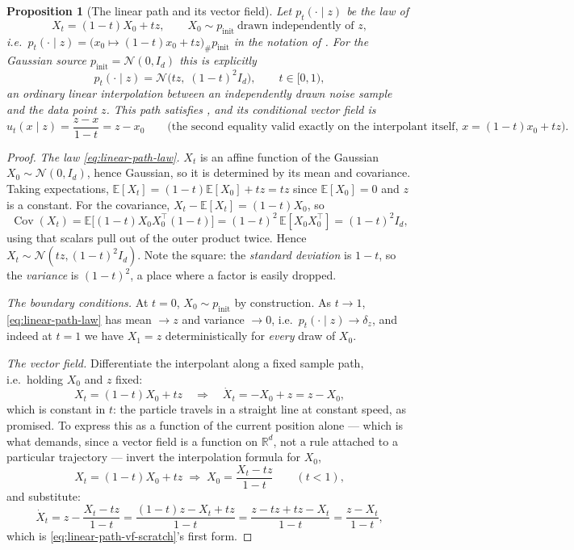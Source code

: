 \documentclass[11pt,a4paper]{report}
\newtheorem{proposition}[proposition]{Proposition}
\theoremstyle{definition}
\theoremstyle{remark}
\DeclareMathOperator{\Cov}{Cov}
\newcommand{\RR}{\mathbb R}
\newcommand{\EE}{\mathbb E}
\begin{document}
\begin{proposition}[The linear path and its vector field]
\label{prop:linear-path-scratch}
Let $p_t(\cdot\mid z)$ be the law of
\[
X_t = (1-t)X_0 + tz , \qquad X_0\sim p_{\mathrm{init}}\ \text{drawn independently of } z ,
\]
i.e.\ $p_t(\cdot\mid z) = \bigl(x_0\mapsto (1-t)x_0+tz\bigr)_{\#}p_{\mathrm{init}}$
in the notation of . For the Gaussian source
$p_{\mathrm{init}}=\mathcal N(0,I_d)$ this is explicitly
\begin{equation}
\label{eq:linear-path-law}
p_t(\cdot\mid z) = \mathcal N\bigl(tz,\;(1-t)^2 I_d\bigr) ,
\qquad t\in[0,1) ,
\end{equation}
an ordinary linear interpolation between an independently drawn noise sample
and the data point $z$. This path satisfies , and its
conditional vector field is
\begin{equation}
\label{eq:linear-path-vf-scratch}
u_t(x\mid z) = \frac{z-x}{1-t} = z - x_0
\qquad\text{(the second equality valid exactly on the interpolant itself, }x=(1-t)x_0+tz\text{).}
\end{equation}
\end{proposition}

\begin{proof}
\emph{The law \eqref{eq:linear-path-law}.} $X_t$ is an affine function of
the Gaussian $X_0\sim\mathcal N(0,I_d)$, hence Gaussian, so it is
determined by its mean and covariance. Taking expectations,
$\EE[X_t] = (1-t)\EE[X_0] + tz = tz$ since $\EE[X_0]=0$ and $z$ is a
constant. For the covariance, $X_t-\EE[X_t] = (1-t)X_0$, so
\[
\Cov(X_t) = \EE\bigl[(1-t)X_0X_0^\top(1-t)\bigr] = (1-t)^2\,\EE[X_0X_0^\top] = (1-t)^2I_d ,
\]
using that scalars pull out of the outer product twice. Hence
$X_t\sim\mathcal N(tz,(1-t)^2I_d)$. Note the square: the \emph{standard
deviation} is $1-t$, so the \emph{variance} is $(1-t)^2$, a place where a
factor is easily dropped.

\emph{The boundary conditions.} At $t=0$, $X_0\sim p_{\mathrm{init}}$ by
construction. As $t\to1$, \eqref{eq:linear-path-law} has mean $\to z$ and
variance $\to0$, i.e.\ $p_t(\cdot\mid z)\to\delta_z$, and indeed at $t=1$
we have $X_1=z$ deterministically for \emph{every} draw of $X_0$.

\emph{The vector field.} Differentiate the interpolant along a fixed sample
path, i.e.\ holding $X_0$ and $z$ fixed:
\[
X_t=(1-t)X_0+tz
\quad\Longrightarrow\quad
\dot X_t = -X_0 + z = z-X_0 ,
\]
which is constant in $t$: the particle travels in a straight line at
constant speed, as promised. To express this as a function of the current
position alone --- which is what  demands, since a
vector field is a function on $\RR^d$, not a rule attached to a particular
trajectory --- invert the interpolation formula for $X_0$,
\[
X_t=(1-t)X_0+tz
\;\Longrightarrow\;
X_0 = \frac{X_t-tz}{1-t}
\qquad (t<1),
\]
and substitute:
\[
\dot X_t
= z-\frac{X_t-tz}{1-t}
= \frac{(1-t)z-X_t+tz}{1-t}
= \frac{z-tz+tz-X_t}{1-t}
= \frac{z-X_t}{1-t} ,
\]
which is \eqref{eq:linear-path-vf-scratch}'s first form.
\end{proof}
\end{document}
